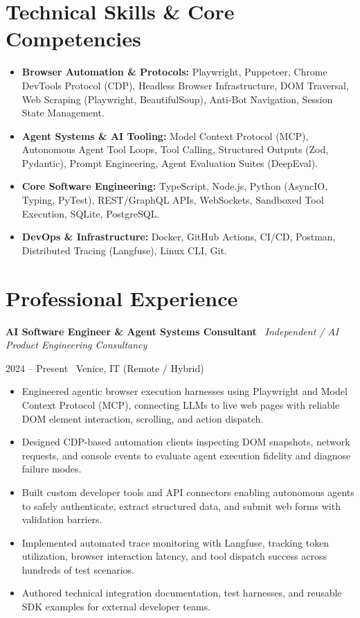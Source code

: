 \documentclass[a4paper,10pt]{article}
\newcommand{\role}[4]{%
  \vspace{2pt}\noindent
  \begin{minipage}[t]{0.70\textwidth}\raggedright\textbf{#1} \textbullet\ \textit{#3}\end{minipage}%
  \hfill
  \begin{minipage}[t]{0.28\textwidth}\raggedleft\footnotesize\color{gray}#2 \textbullet\ #4\end{minipage}%
  \vspace{1pt}%
}
\begin{document}
\section{Technical Skills \& Core Competencies}
\begin{itemize}[leftmargin=1.2em, itemsep=2pt]
  \item \textbf{Browser Automation \& Protocols:} Playwright, Puppeteer, Chrome DevTools Protocol (CDP), Headless Browser Infrastructure, DOM Traversal, Web Scraping (Playwright, BeautifulSoup), Anti-Bot Navigation, Session State Management.
  \item \textbf{Agent Systems \& AI Tooling:} Model Context Protocol (MCP), Autonomous Agent Tool Loops, Tool Calling, Structured Outputs (Zod, Pydantic), Prompt Engineering, Agent Evaluation Suites (DeepEval).
  \item \textbf{Core Software Engineering:} TypeScript, Node.js, Python (AsyncIO, Typing, PyTest), REST/GraphQL APIs, WebSockets, Sandboxed Tool Execution, SQLite, PostgreSQL.
  \item \textbf{DevOps \& Infrastructure:} Docker, GitHub Actions, CI/CD, Postman, Distributed Tracing (Langfuse), Linux CLI, Git.
\end{itemize}

\section{Professional Experience}

\role{AI Software Engineer \& Agent Systems Consultant}{2024 -- Present}{Independent / AI Product Engineering Consultancy}{Venice, IT (Remote / Hybrid)}
\begin{itemize}
  \item Engineered agentic browser execution harnesses using Playwright and Model Context Protocol (MCP), connecting LLMs to live web pages with reliable DOM element interaction, scrolling, and action dispatch.
  \item Designed CDP-based automation clients inspecting DOM snapshots, network requests, and console events to evaluate agent execution fidelity and diagnose failure modes.
  \item Built custom developer tools and API connectors enabling autonomous agents to safely authenticate, extract structured data, and submit web forms with validation barriers.
  \item Implemented automated trace monitoring with Langfuse, tracking token utilization, browser interaction latency, and tool dispatch success across hundreds of test scenarios.
  \item Authored technical integration documentation, test harnesses, and reusable SDK examples for external developer teams.
\end{itemize}
\end{document}
